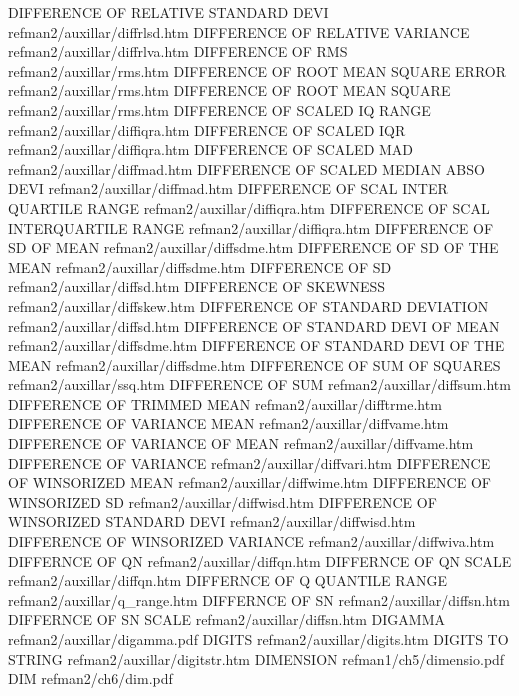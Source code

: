 DIFFERENCE OF RELATIVE STANDARD DEVI    refman2/auxillar/diffrlsd.htm
DIFFERENCE OF RELATIVE VARIANCE         refman2/auxillar/diffrlva.htm
DIFFERENCE OF RMS                       refman2/auxillar/rms.htm
DIFFERENCE OF ROOT MEAN SQUARE ERROR    refman2/auxillar/rms.htm
DIFFERENCE OF ROOT MEAN SQUARE          refman2/auxillar/rms.htm
DIFFERENCE OF SCALED IQ RANGE           refman2/auxillar/diffiqra.htm
DIFFERENCE OF SCALED IQR                refman2/auxillar/diffiqra.htm
DIFFERENCE OF SCALED MAD                refman2/auxillar/diffmad.htm
DIFFERENCE OF SCALED MEDIAN ABSO DEVI   refman2/auxillar/diffmad.htm
DIFFERENCE OF SCAL INTER QUARTILE RANGE refman2/auxillar/diffiqra.htm
DIFFERENCE OF SCAL INTERQUARTILE RANGE  refman2/auxillar/diffiqra.htm
DIFFERENCE OF SD OF MEAN                refman2/auxillar/diffsdme.htm
DIFFERENCE OF SD OF THE MEAN            refman2/auxillar/diffsdme.htm
DIFFERENCE OF SD                        refman2/auxillar/diffsd.htm
DIFFERENCE OF SKEWNESS                  refman2/auxillar/diffskew.htm
DIFFERENCE OF STANDARD DEVIATION        refman2/auxillar/diffsd.htm
DIFFERENCE OF STANDARD DEVI OF MEAN     refman2/auxillar/diffsdme.htm
DIFFERENCE OF STANDARD DEVI OF THE MEAN refman2/auxillar/diffsdme.htm
DIFFERENCE OF SUM OF SQUARES            refman2/auxillar/ssq.htm
DIFFERENCE OF SUM                       refman2/auxillar/diffsum.htm
DIFFERENCE OF TRIMMED MEAN              refman2/auxillar/difftrme.htm
DIFFERENCE OF VARIANCE MEAN             refman2/auxillar/diffvame.htm
DIFFERENCE OF VARIANCE OF MEAN          refman2/auxillar/diffvame.htm
DIFFERENCE OF VARIANCE                  refman2/auxillar/diffvari.htm
DIFFERENCE OF WINSORIZED MEAN           refman2/auxillar/diffwime.htm
DIFFERENCE OF WINSORIZED SD             refman2/auxillar/diffwisd.htm
DIFFERENCE OF WINSORIZED STANDARD DEVI  refman2/auxillar/diffwisd.htm
DIFFERENCE OF WINSORIZED VARIANCE       refman2/auxillar/diffwiva.htm
DIFFERNCE OF QN                         refman2/auxillar/diffqn.htm
DIFFERNCE OF QN SCALE                   refman2/auxillar/diffqn.htm
DIFFERNCE OF Q QUANTILE RANGE           refman2/auxillar/q_range.htm
DIFFERNCE OF SN                         refman2/auxillar/diffsn.htm
DIFFERNCE OF SN SCALE                   refman2/auxillar/diffsn.htm
DIGAMMA                                 refman2/auxillar/digamma.pdf
DIGITS                                  refman2/auxillar/digits.htm
DIGITS TO STRING                        refman2/auxillar/digitstr.htm
DIMENSION                               refman1/ch5/dimensio.pdf
DIM                                     refman2/ch6/dim.pdf
